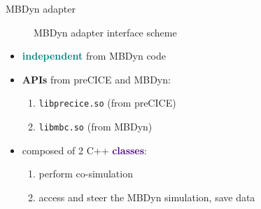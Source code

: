 \documentclass[10pt,t]{beamer}
\begin{document}
\begin{frame}{MBDyn adapter}
\begin{figure}
    \caption{MBDyn adapter interface scheme}
    \label{fig:adapter_scheme}
\end{figure}




    
    
    \begin{itemize}
     \itemsep 8pt
        \item \textcolor{teal}{\textbf{independent}} from MBDyn code
        \item \textcolor{dblue}{\textbf{APIs}} from preCICE and MBDyn:
        \begin{enumerate}
            \itemsep 5pt
            \item \texttt{libprecice.so}   \hspace{0.6cm} (from preCICE)
            \item \texttt{libmbc.so}       \hspace{1.27cm}    (from MBDyn)
        \end{enumerate}
        
        \item composed of 2 C++ \textcolor{indigo}{\textbf{classes}}:
        \begin{enumerate}
            \itemsep 5pt
            \item perform co-simulation
            \item access and steer the MBDyn simulation, save data
        \end{enumerate}
        
    \end{itemize}
\end{frame}
\end{document}
